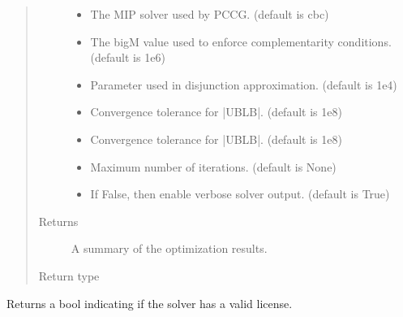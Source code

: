 \documentclass[letterpaper,10pt,english]{sphinxmanual}
\begin{document}
\begin{fulllineitems}
\begin{fulllineitems}
\begin{quote}
\begin{description}
\begin{itemize}
\item {} 
 \textendash{} The MIP solver used by PCCG.  (default is cbc)

\item {} 
 \textendash{} The big\sphinxhyphen{}M value used to enforce complementarity conditions.       (default is 1e6)

\item {} 
 \textendash{} Parameter used in disjunction approximation. (default is 1e\sphinxhyphen{}4)

\item {} 
 \textendash{} Convergence tolerance for |UB\sphinxhyphen{}LB|. (default is 1e\sphinxhyphen{}8)

\item {} 
 \textendash{} Convergence tolerance for |UB\sphinxhyphen{}LB|. (default is 1e\sphinxhyphen{}8)

\item {} 
 \textendash{} Maximum number of iterations. (default is None)

\item {} 
 \textendash{} If False, then enable verbose solver output. (default is True)

\end{itemize}

\item[{Returns}] \leavevmode
A summary of the optimization results.

\item[{Return type}] \leavevmode
{\hyperref[\detokenize{reference/solverapi:pao.common.solver.Results}]{}}

\end{description}\end{quote}

\end{fulllineitems}


\begin{fulllineitems}
\label{\detokenize{reference/mpr:pao.mpr.solvers.pccg.LinearMultilevelSolver_PCCG.valid_license}}
Returns a bool indicating if the solver has a valid license.


\end{fulllineitems}
\end{fulllineitems}
\end{document}
